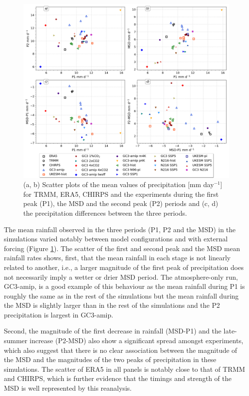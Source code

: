  
 
\label{sq:msdclim}
 \begin{figure}[t!]
\includegraphics[width=\linewidth]{figures/dumscatter_2.png}
\caption{(a, b) Scatter plots of the mean values of precipitation [mm day$^{-1}$] for TRMM, ERA5, CHIRPS and the experiments during the first peak (P1), the MSD and the second peak (P2) periods and (c, d) the precipitation differences between the three periods. 
  }
\label{fig:scatter_msd}
\end{figure} 

The mean rainfall observed in the three periods (P1, P2 and the MSD) in the simulations varied notably between model configurations and with external forcing (Figure \ref{fig:scatter_msd}).
 The scatter of the first and second peak and the MSD mean rainfall rates  shows, first, that the mean rainfall in each stage is not linearly related to another, i.e., a larger magnitude of the first peak of precipitation does not necessarily imply a wetter or drier MSD period. The atmosphere-only run, GC3-amip, is a good example of this behaviour as the mean rainfall during P1 is roughly the same as in the rest of the simulations but the mean rainfall during the MSD is slightly larger than in the rest of the simulations and the P2 precipitation is largest in GC3-amip. 
 
 
Second, the magnitude of the first decrease in rainfall (MSD-P1) and the late-summer increase (P2-MSD) also show a significant spread amongst experiments, which also suggest that there is no clear association between the magnitude of the MSD and the magnitudes of the two peaks of precipitation in these simulations. The scatter of ERA5 in all panels is notably close to that of TRMM and CHIRPS, which is further evidence that the timings and strength of the MSD is well represented by this reanalysis.

